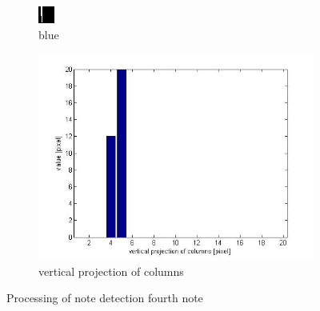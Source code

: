 \begin{figure}
\begin{subfigure}[t]{0.1\textwidth}
        \includegraphics[width=\textwidth]{4b.jpg}
        \caption{blue}
  \end{subfigure}
    \begin{subfigure}[c]{0.4\textwidth}
        \includegraphics[width=\textwidth]{4c.jpg}
        \caption{vertical projection of columns}
  \end{subfigure}
	\caption{Processing of note detection fourth note}
	\label{fig:noteValues4}
\end{figure}

